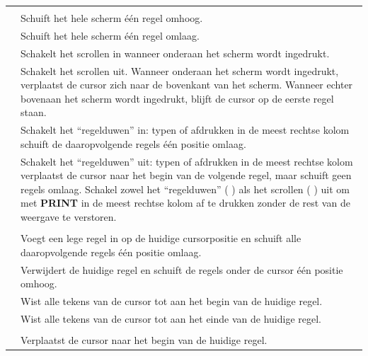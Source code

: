 \begin{center}
\begin{longtable}{c|L{5.5cm}}
  \hhline{==}
   \\
  \hhline{==}
  &
Schuift het hele scherm één regel omhoog.\\
\hline
{}  &
Schuift het hele scherm één regel omlaag.\\
\hline
{}  &
Schakelt het scrollen in wanneer \megakey{$\downarrow$} onderaan het scherm wordt ingedrukt.\\
\hline
{}  &
Schakelt het scrollen uit. Wanneer \megakey{$\downarrow$} onderaan het scherm wordt ingedrukt, verplaatst de cursor zich naar de bovenkant van het scherm. Wanneer \megakey{$\uparrow$} echter bovenaan het scherm wordt ingedrukt, blijft de cursor op de eerste regel staan.\\
\hline
{}  &
Schakelt het ``regelduwen'' in: typen of afdrukken in de meest rechtse kolom schuift de daaropvolgende regels één positie omlaag.\\
\hline
{}  &
Schakelt het ``regelduwen'' uit: typen of afdrukken in de meest rechtse kolom verplaatst de cursor naar het begin van de volgende regel, maar schuift geen regels omlaag. Schakel zowel het ``regelduwen'' ( ) als het scrollen ( ) uit om met {\bf PRINT} in de meest rechtse kolom af te drukken zonder de rest van de weergave te verstoren.\\
\hhline{==}
   \\
  \hhline{==}
  &
Voegt een lege regel in op de huidige cursorpositie en schuift alle daaropvolgende regels één positie omlaag.\\
\hline
{}  &
Verwijdert de huidige regel en schuift de regels onder de cursor één positie omhoog.\\
\hline
{}  &
Wist alle tekens van de cursor tot aan het begin van de huidige regel.\\
\hline
{}  &
Wist alle tekens van de cursor tot aan het einde van de huidige regel.\\
  \hhline{==}
   \\
  \hhline{==}
  &
Verplaatst de cursor naar het begin van de huidige regel.\\

\end{longtable}
\end{center}
